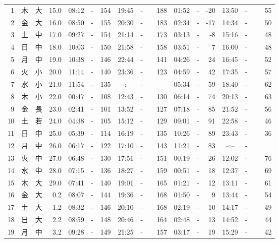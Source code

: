 \documentclass[12pt.a4j]{jsarticle}
\begin{document}
\begin{center}
\begin{table}[ht]
\begin{tabular}{|rc|cr|ccrccr|ccrccr|}
 \hline
 1 & 木 & 大 & 15.0 &  08:12 &-& 154  &  19:45 &-& 188  &   01:52 &-& -20  &   13:50 &-&  55  \\
 2 & 金 & 大 & 16.0 &  08:50 &-& 155  &  20:30 &-& 183  &   02:34 &-& -17  &   14:34 &-&  50  \\
 3 & 土 & 中 & 17.0 &  09:27 &-& 154  &  21:14 &-& 173  &   03:13 &-&  -8  &   15:16 &-&  48  \\
 4 & 日 & 中 & 18.0 &  10:03 &-& 150  &  21:58 &-& 158  &   03:51 &-&   7  &   16:00 &-&  48  \\
 5 & 月 & 中 & 19.0 &  10:38 &-& 146  &  22:44 &-& 141  &   04:26 &-&  24  &   16:45 &-&  52  \\
 6 & 火 & 小 & 20.0 &  11:14 &-& 140  &  23:36 &-& 123  &   04:59 &-&  42  &   17:35 &-&  57  \\
 7 & 水 & 小 & 21.0 &  11:54 &-& 135  &  --:-- &-&~~~~~ &   05:34 &-&  59  &   18:40 &-&  62  \\
 8 & 木 & 小 & 22.0 &  00:47 &-& 108  &  12:43 &-& 130  &   06:14 &-&  74  &   20:13 &-&  63  \\
 9 & 金 & 長 & 23.0 &  02:41 &-& 101  &  13:52 &-& 127  &   07:18 &-&  85  &   21:52 &-&  56  \\
10 & 土 & 若 & 24.0 &  04:38 &-& 105  &  15:12 &-& 129  &   09:01 &-&  91  &   22:58 &-&  46  \\
11 & 日 & 中 & 25.0 &  05:39 &-& 114  &  16:19 &-& 135  &   10:26 &-&  89  &   23:43 &-&  36  \\
12 & 月 & 中 & 26.0 &  06:17 &-& 122  &  17:10 &-& 143  &   11:21 &-&  83  &   --:-- &-&~~~~~ \\
13 & 火 & 中 & 27.0 &  06:48 &-& 130  &  17:51 &-& 151  &   00:19 &-&  26  &   12:02 &-&  76  \\
14 & 水 & 中 & 28.0 &  07:15 &-& 136  &  18:27 &-& 159  &   00:51 &-&  18  &   12:37 &-&  69  \\
15 & 木 & 大 & 29.0 &  07:41 &-& 140  &  19:01 &-& 165  &   01:21 &-&  12  &   13:11 &-&  61  \\
16 & 金 & 大 &  0.2 &  08:07 &-& 144  &  19:36 &-& 168  &   01:50 &-&   9  &   13:44 &-&  54  \\
17 & 土 & 大 &  1.2 &  08:32 &-& 146  &  20:10 &-& 168  &   02:19 &-&  10  &   14:17 &-&  49  \\
18 & 日 & 大 &  2.2 &  08:59 &-& 148  &  20:46 &-& 164  &   02:48 &-&  13  &   14:52 &-&  44  \\
19 & 月 & 中 &  3.2 &  09:28 &-& 149  &  21:25 &-& 157  &   03:17 &-&  19  &   15:29 &-&  42  \\

\end{tabular}
\end{table}
\end{center}
\end{document}
